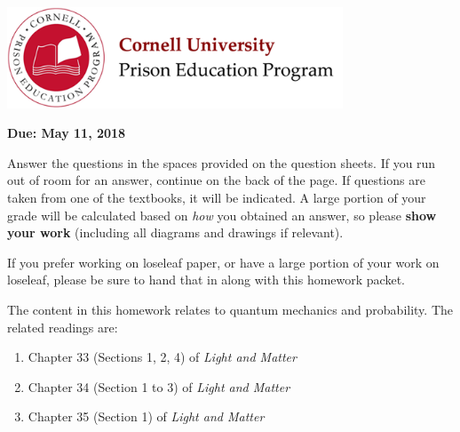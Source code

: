 \documentclass[addpoints,12pt]{exam}
\begin{document}

\begin{flushright}
\vspace{0.2in}

\end{flushright}

\begin{center}
\includegraphics[width=10cm]{../images/logo.png}
\end{center}

\begin{center}
\end{center}

\noindent\begin{large}\textbf{Due: May 11, 2018}\end{large}
\vspace{0.2in}

Answer the questions in the spaces provided on the question sheets. If you run out of room for an answer, continue on the back of the page. If questions are taken from one of the textbooks, it will be indicated. A large portion of your grade will be calculated based on \textit{how} you obtained an answer, so please \textbf{show your work} (including all diagrams and drawings if relevant).

If you prefer working on loseleaf paper, or have a large portion of your work on loseleaf, please be sure to hand that in along with this homework packet.

The content in this homework relates to quantum mechanics and probability. The related readings are:
\begin{enumerate}
	\item Chapter 33 (Sections 1, 2, 4) of \textit{Light and Matter}
	\item Chapter 34 (Section 1 to 3) of \textit{Light and Matter}
	\item Chapter 35 (Section 1) of \textit{Light and Matter}
\end{enumerate}
 
\end{document}
